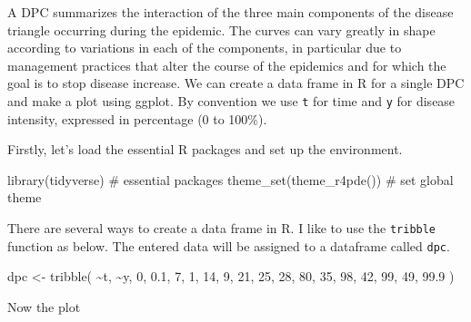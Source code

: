 \documentclass[
  letterpaper,
]{book}
\newenvironment{Shaded}{\begin{snugshade}}{\end{snugshade}}
\newcommand{\CommentTok}[1]{\textcolor[rgb]{0.37,0.37,0.37}{#1}}
\newcommand{\DecValTok}[1]{\textcolor[rgb]{0.68,0.00,0.00}{#1}}
\newcommand{\FloatTok}[1]{\textcolor[rgb]{0.68,0.00,0.00}{#1}}
\newcommand{\FunctionTok}[1]{\textcolor[rgb]{0.28,0.35,0.67}{#1}}
\newcommand{\NormalTok}[1]{\textcolor[rgb]{0.00,0.23,0.31}{#1}}
\newcommand{\OtherTok}[1]{\textcolor[rgb]{0.00,0.23,0.31}{#1}}
\newcommand{\SpecialCharTok}[1]{\textcolor[rgb]{0.37,0.37,0.37}{#1}}
\begin{document}
A DPC summarizes the interaction of the three main components of the
disease triangle occurring during the epidemic. The curves can vary
greatly in shape according to variations in each of the components, in
particular due to management practices that alter the course of the
epidemics and for which the goal is to stop disease increase. We can
create a data frame in R for a single DPC and make a plot using ggplot.
By convention we use \texttt{t} for time and \texttt{y} for disease
intensity, expressed in percentage (0 to 100\%).

Firstly, let's load the essential R packages and set up the environment.

\begin{Shaded}
\begin{Highlighting}[]
\FunctionTok{library}\NormalTok{(tidyverse) }\CommentTok{\# essential packages }
\FunctionTok{theme\_set}\NormalTok{(}\FunctionTok{theme\_r4pde}\NormalTok{()) }\CommentTok{\# set global theme}
\end{Highlighting}
\end{Shaded}

There are several ways to create a data frame in R. I like to use the
\texttt{tribble} function as below. The entered data will be assigned to
a dataframe called \texttt{dpc}.

\begin{Shaded}
\begin{Highlighting}[]
\NormalTok{dpc }\OtherTok{\textless{}{-}} 
  \FunctionTok{tribble}\NormalTok{(}
   \SpecialCharTok{\textasciitilde{}}\NormalTok{t,  }\SpecialCharTok{\textasciitilde{}}\NormalTok{y, }
   \DecValTok{0}\NormalTok{,  }\FloatTok{0.1}\NormalTok{, }
   \DecValTok{7}\NormalTok{,  }\DecValTok{1}\NormalTok{, }
  \DecValTok{14}\NormalTok{,  }\DecValTok{9}\NormalTok{, }
  \DecValTok{21}\NormalTok{,  }\DecValTok{25}\NormalTok{, }
  \DecValTok{28}\NormalTok{,  }\DecValTok{80}\NormalTok{, }
  \DecValTok{35}\NormalTok{, }\DecValTok{98}\NormalTok{, }
  \DecValTok{42}\NormalTok{, }\DecValTok{99}\NormalTok{, }
  \DecValTok{49}\NormalTok{, }\FloatTok{99.9}
\NormalTok{  )}
\end{Highlighting}
\end{Shaded}

Now the plot
\end{document}

